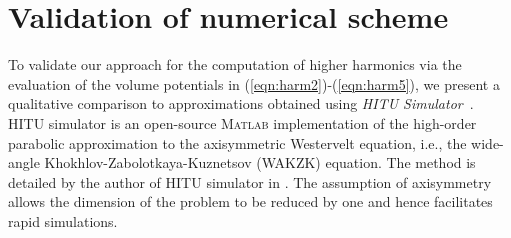 \documentclass[preprint]{JASA}
\begin{document}
\section{Validation of numerical scheme}
\label{sec:validation}
To validate our approach for the computation of higher harmonics via the 
evaluation of the volume potentials in (\ref{eqn:harm2})-(\ref{eqn:harm5}), we 
present a qualitative  comparison to approximations obtained using 
\textit{HITU Simulator}~\cite{HITUwebpage}. HITU simulator is an open-source \textsc{Matlab}
implementation of the high-order parabolic approximation to the axisymmetric 
Westervelt equation, i.e., the wide-angle Khokhlov-Zabolotkaya-Kuznetsov (WAKZK) equation.
The method is detailed by the author of HITU simulator in \cite{soneson2017extending}.
The assumption of axisymmetry allows the dimension of the problem to be reduced 
by one and hence facilitates rapid simulations. 
\end{document}
